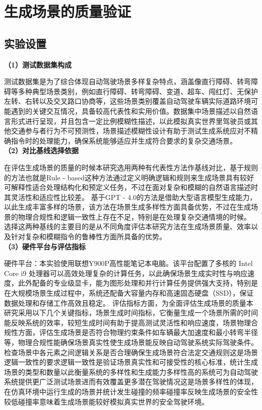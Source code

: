 \chapter{生成场景的质量验证}
\section{实验设置}
\textbf{（1）测试数据集构成} \par
测试数据集是为了综合体现自动驾驶场景多样复杂特点，涵盖像直行障碍、转弯障碍等多种典型场景类别，例如直行障碍、转弯障碍、变道、超车、闯红灯、无保护左转、右转以及交叉路口协商等，这些场景类别覆盖自动驾驶车辆实际道路环境可能遇到的关键交互情况，具备较高代表性和实用价值。数据集中场景描述以自然语言形式进行呈现，并且包含一定比例模糊性描述，以此模拟真实世界里驾驶员或其他交通参与者行为不可预测性，场景描述模糊性设计有助于测试生成系统应对不精确指令时的处理能力，确保系统能够适应并生成符合要求的复杂交通场景。\\
\indent\textbf{（2）对比基线选择依据} \par
在评估生成场景的质量的时候本研究选用两种有代表性方法作基线对比，基于规则的方法也就是Rule - based这种方法通过定义明确逻辑和规则来生成场景具有较好可解释性适合处理结构化和预定义任务，不过在面对复杂和模糊的自然语言描述时其灵活性和适应性比较差。
基于GPT - 4.0的方法是借助大型语言模型生成能力，以此生成丰富多样的场景，该方法在场景生成多样性方面具备优势，不过在生成场景的物理合规性和逻辑一致性上存在不足，特别是在处理复杂交通情境的时候。
选择这两种基线的主要目的是从不同角度评估本研究方法在生成场景质量、效率以及针对复杂和模糊指令的鲁棒性方面所具备的优势。\\
\indent\textbf{（3）硬件平台与评估指标} \par
硬件平台：本实验使用联想Y900P高性能笔记本电脑。该平台配置了多核的 Intel Core i9 处理器可以高效处理复杂的计算任务，以此确保场景生成实时性与响应速度，此外配备的专业级显卡，能为图形处理和并行计算任务提供强大支持，特别是在大规模场景生成过程中，系统还配备大容量内存和高速固态硬盘（SSD），保证数据处理和存储工作高效且稳定。
评估指标方面，为全面评估生成场景的质量本研究采用以下几个关键指标，场景生成时间指标，它衡量生成一个场景所需的时间能反映系统的效率，较短生成时间有助于提高测试灵活性和响应速度，场景物理合规性方面，评估生成场景是否符合物理约束条件如车辆最大加速度和最小转弯半径等，物理合规性能确保场景真实性使生成场景能反映自动驾驶系统实际驾驶条件。
检查场景中各元素之间逻辑关系是否合理确保生成场景符合法定交通规则这是场景逻辑一致性的要求逻辑一致性是验证场景真实性和可接受性的核心标准，统计生成场景的类型和数量以此衡量系统的多样性和生成能力多样性高的系统可为自动驾驶系统提供更广泛测试场景进而有效覆盖更多潜在驾驶情况这是场景多样性的体现，在仿真环境中运行生成的场景并统计发生碰撞的频率碰撞率反映生成场景的安全性较低碰撞率意味着生成场景能较好模拟真实世界的安全驾驶环境。




